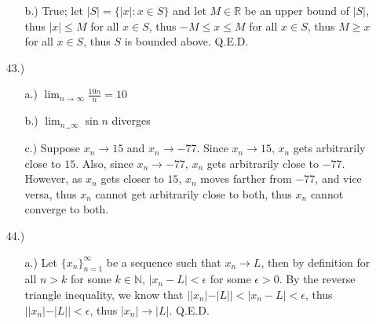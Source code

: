 \documentclass[12pt]{article}
\newcommand{\vertb}[1]{\left\vert#1\right\vert}
\begin{document}
\begin{itemize}
\begin{itemize}
        \item [b.)] True; let $\vert S\vert=\{\vert x\vert:x\in S\}$ and let $M\in\mathbb{R}$ be an upper bound of $\vert S\vert$, thus $\vert x\vert\leq M$ for all $x\in S$, thus $-M\leq x\leq M$ for all $x\in S$, thus $M\geq x$ for all $x\in S$, thus $S$ is bounded above. Q.E.D.
    \end{itemize}






    \item [43.)] \begin{itemize}
        \item [a.)] $\displaystyle\lim_{n\to\infty}\frac{10n}{n}=10$

        \item [b.)] $\displaystyle\lim_{n_\to\infty}\sin n$ diverges

        \item [c.)] Suppose $x_n\to15$ and $x_n\to-77$. Since $x_n\to15$, $x_n$ gets arbitrarily close to $15$. Also, since $x_n\to-77$, $x_n$ gets arbitrarily close to $-77$. However, as $x_n$ gets closer to $15$, $x_n$ moves farther from $-77$, and vice versa, thus $x_n$ cannot get arbitrarily close to both, thus $x_n$ cannot converge to both.
    \end{itemize}

    \item [44.)] \begin{itemize}
        \item [a.)] Let $\{x_n\}^\infty_{n=1}$ be a sequence such that $x_n\to L$, then by definition for all $n>k$ for some $k\in\mathbb{N}$, $\vert x_n-L\vert<\epsilon$ for some $\epsilon>0$. By the reverse triangle inequality, we know that $\Big\vert\vert x_n\vert-\vert L\vert\Big\vert<\vert x_n-L\vert<\epsilon$, thus $\Big\vert\vert x_n\vert-\vert L\vert\Big\vert<\epsilon$, thus $\vert x_n\vert\to\vert L\vert$. Q.E.D.


\end{itemize}
\end{itemize}
\end{document}
